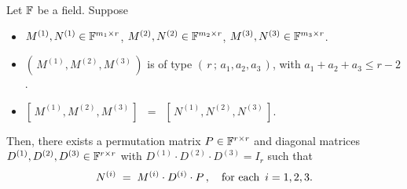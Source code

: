 \begin{theorem}
\label{KruskalTheorem}
\mbox{}\vskip 0.1cm
\noindent
Let $\mathbb{F}$ be a field. Suppose
\begin{itemize}
\item
	$M^{(1)}, N^{(1)} \in \mathbb{F}^{m_{1} \times r}$,\;
	$M^{(2)}, N^{(2)} \in \mathbb{F}^{m_{2} \times r}$,\;
	$M^{(3)}, N^{(3)} \in \mathbb{F}^{m_{3} \times r}$.
\item
	$\left(\,M^{(1)},M^{(2)},M^{(3)}\,\right)$ is of type $\left(\,r\,;\,a_{1},a_{2},a_{3}\,\right)$,
	with $a_{1} + a_{2} + a_{3} \leq r - 2$.
\item
	$\left[\,M^{(1)},M^{(2)},M^{(3)}\,\right]$
	\,$=$\,
	$\left[\,N^{(1)},N^{(2)},N^{(3)}\,\right]$.
\end{itemize}
Then, there exists a permutation matrix $P \in \mathbb{F}^{r \times r}$ and diagonal matrices
$D^{(1)}, D^{(2)}, D^{(3)} \in \mathbb{F}^{r \times r}$ with $D^{(1)}\cdot D^{(2)}\cdot D^{(3)} = I_{r}$
such that
\begin{equation*}
N^{(i)} \; = \; M^{(i)} \cdot D^{(i)} \cdot P\,,
\quad
\textnormal{for each \,$i = 1,2,3$}.
\end{equation*}
\end{theorem}

